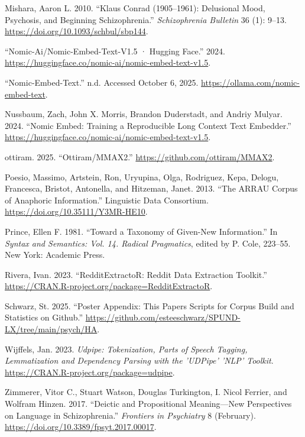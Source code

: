 \documentclass[
  12pt,
  oneside]{book}
\newlength{\cslhangindent}
\newenvironment{CSLReferences}[2] %
 {\begin{list}{}{%
  \setlength{\itemindent}{0pt}
  \setlength{\leftmargin}{0pt}
  \setlength{\parsep}{0pt}
  \ifodd #1
   \setlength{\leftmargin}{\cslhangindent}
   \setlength{\itemindent}{-1\cslhangindent}
  \fi
  \setlength{\itemsep}{#2\baselineskip}}}
 {\end{list}}
\begin{document}
\begin{CSLReferences}{1}{0}
Mishara, Aaron L. 2010. {``Klaus {Conrad} (1905--1961): {Delusional} {Mood}, {Psychosis}, and {Beginning} {Schizophrenia}.''} \emph{Schizophrenia Bulletin} 36 (1): 9--13. \url{https://doi.org/10.1093/schbul/sbp144}.

{``Nomic-Ai/Nomic-Embed-Text-V1.5 · {Hugging} {Face}.''} 2024. \url{https://huggingface.co/nomic-ai/nomic-embed-text-v1.5}.

{``Nomic-Embed-Text.''} n.d. Accessed October 6, 2025. \url{https://ollama.com/nomic-embed-text}.

Nussbaum, Zach, John X. Morris, Brandon Duderstadt, and Andriy Mulyar. 2024. {``Nomic {Embed}: {Training} a {Reproducible} {Long} {Context} {Text} {Embedder}.''} \url{https://huggingface.co/nomic-ai/nomic-embed-text-v1.5}.

ottiram. 2025. {``Ottiram/{MMAX2}.''} \url{https://github.com/ottiram/MMAX2}.

Poesio, Massimo, Artstein, Ron, Uryupina, Olga, Rodriguez, Kepa, Delogu, Francesca, Bristot, Antonella, and Hitzeman, Janet. 2013. {``The {ARRAU} {Corpus} of {Anaphoric} {Information}.''} Linguistic Data Consortium. \url{https://doi.org/10.35111/Y3MR-HE10}.

Prince, Ellen F. 1981. {``Toward a Taxonomy of Given-New Information.''} In \emph{Syntax and Semantics: {Vol}. 14. {Radical} {Pragmatics}}, edited by P. Cole, 223--55. New York: Academic Press.

Rivera, Ivan. 2023. {``{RedditExtractoR}: {Reddit} {Data} {Extraction} {Toolkit}.''} \url{https://CRAN.R-project.org/package=RedditExtractoR}.

Schwarz, St. 2025. {``Poster Appendix: This Papers Scripts for Corpus Build and Statistics on Github.''} \url{https://github.com/esteeschwarz/SPUND-LX/tree/main/psych/HA}.

Wijffels, Jan. 2023. \emph{Udpipe: {Tokenization}, {Parts} of {Speech} {Tagging}, {Lemmatization} and {Dependency} {Parsing} with the '{UDPipe}' '{NLP}' {Toolkit}}. \url{https://CRAN.R-project.org/package=udpipe}.

Zimmerer, Vitor C., Stuart Watson, Douglas Turkington, I. Nicol Ferrier, and Wolfram Hinzen. 2017. {``Deictic and {Propositional} {Meaning}---{New} {Perspectives} on {Language} in {Schizophrenia}.''} \emph{Frontiers in Psychiatry} 8 (February). \url{https://doi.org/10.3389/fpsyt.2017.00017}.

\end{CSLReferences}
\end{document}
